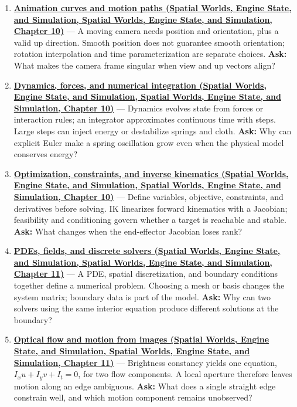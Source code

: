 \begin{enumerate}
\item
  \textbf{\href{../05-Spatial-Worlds-Engine-State-and-Simulation/main.pdf\#nameddest=04-visual-computing-ii-ch029-animation-curves-and-motion-paths}{Animation curves and motion paths (Spatial Worlds, Engine State, and Simulation, Spatial Worlds, Engine State, and Simulation, Chapter 10)}} --- A moving camera needs position and orientation, plus a valid up direction. Smooth position does not guarantee smooth orientation; rotation interpolation and time parameterization are separate choices. \textbf{Ask:} What makes the camera frame singular when view and up vectors align?
\item
  \textbf{\href{../05-Spatial-Worlds-Engine-State-and-Simulation/main.pdf\#nameddest=04-visual-computing-ii-ch029-dynamics-forces-and-numerical-integration}{Dynamics, forces, and numerical integration (Spatial Worlds, Engine State, and Simulation, Spatial Worlds, Engine State, and Simulation, Chapter 10)}} --- Dynamics evolves state from forces or interaction rules; an integrator approximates continuous time with steps. Large steps can inject energy or destabilize springs and cloth. \textbf{Ask:} Why can explicit Euler make a spring oscillation grow even when the physical model conserves energy?
\item
  \textbf{\href{../05-Spatial-Worlds-Engine-State-and-Simulation/main.pdf\#nameddest=04-visual-computing-ii-ch029-optimization-constraints-and-inverse-kinematics}{Optimization, constraints, and inverse kinematics (Spatial Worlds, Engine State, and Simulation, Spatial Worlds, Engine State, and Simulation, Chapter 10)}} --- Define variables, objective, constraints, and derivatives before solving. IK linearizes forward kinematics with a Jacobian; feasibility and conditioning govern whether a target is reachable and stable. \textbf{Ask:} What changes when the end-effector Jacobian loses rank?
\item
  \textbf{\href{../05-Spatial-Worlds-Engine-State-and-Simulation/main.pdf\#nameddest=04-visual-computing-ii-ch030-pdes-fields-and-discrete-solvers}{PDEs, fields, and discrete solvers (Spatial Worlds, Engine State, and Simulation, Spatial Worlds, Engine State, and Simulation, Chapter 11)}} --- A PDE, spatial discretization, and boundary conditions together define a numerical problem. Choosing a mesh or basis changes the system matrix; boundary data is part of the model. \textbf{Ask:} Why can two solvers using the same interior equation produce different solutions at the boundary?
\item
  \textbf{\href{../05-Spatial-Worlds-Engine-State-and-Simulation/main.pdf\#nameddest=04-visual-computing-ii-ch030-optical-flow-and-motion-from-images}{Optical flow and motion from images (Spatial Worlds, Engine State, and Simulation, Spatial Worlds, Engine State, and Simulation, Chapter 11)}} --- Brightness constancy yields one equation, \(I_xu+I_yv+I_t=0\), for two flow components. A local aperture therefore leaves motion along an edge ambiguous. \textbf{Ask:} What does a single straight edge constrain well, and which motion component remains unobserved?

\end{enumerate}
